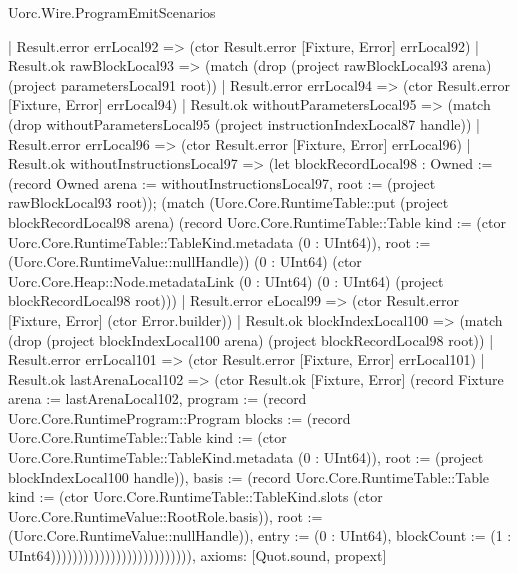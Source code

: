 \begin{lexlean}{Uorc.Wire.ProgramEmitScenarios}
\begin{semanticmodule}
{                            | Result.error errLocal92 => (ctor Result.error [Fixture, Error] errLocal92)
                            | Result.ok rawBlockLocal93 => (match (drop (project rawBlockLocal93 arena) (project parametersLocal91 root))
                              | Result.error errLocal94 => (ctor Result.error [Fixture, Error] errLocal94)
                              | Result.ok withoutParametersLocal95 => (match (drop withoutParametersLocal95 (project instructionIndexLocal87 handle))
                                | Result.error errLocal96 => (ctor Result.error [Fixture, Error] errLocal96)
                                | Result.ok withoutInstructionsLocal97 => (let blockRecordLocal98 : Owned := (record Owned {arena := withoutInstructionsLocal97, root := (project rawBlockLocal93 root)}); (match (Uorc.Core.RuntimeTable::put (project blockRecordLocal98 arena) (record Uorc.Core.RuntimeTable::Table {kind := (ctor Uorc.Core.RuntimeTable::TableKind.metadata (0 : UInt64)), root := (Uorc.Core.RuntimeValue::nullHandle)}) (0 : UInt64) (ctor Uorc.Core.Heap::Node.metadataLink (0 : UInt64) (0 : UInt64) (project blockRecordLocal98 root)))
                                  | Result.error eLocal99 => (ctor Result.error [Fixture, Error] (ctor Error.builder))
                                  | Result.ok blockIndexLocal100 => (match (drop (project blockIndexLocal100 arena) (project blockRecordLocal98 root))
                                    | Result.error errLocal101 => (ctor Result.error [Fixture, Error] errLocal101)
                                    | Result.ok lastArenaLocal102 => (ctor Result.ok [Fixture, Error] (record Fixture {arena := lastArenaLocal102, program := (record Uorc.Core.RuntimeProgram::Program {blocks := (record Uorc.Core.RuntimeTable::Table {kind := (ctor Uorc.Core.RuntimeTable::TableKind.metadata (0 : UInt64)), root := (project blockIndexLocal100 handle)}), basis := (record Uorc.Core.RuntimeTable::Table {kind := (ctor Uorc.Core.RuntimeTable::TableKind.slots (ctor Uorc.Core.RuntimeValue::RootRole.basis)), root := (Uorc.Core.RuntimeValue::nullHandle)}), entry := (0 : UInt64), blockCount := (1 : UInt64)})})))))))))))))))))))))))),
  axioms: [Quot.sound, propext]
}


\end{semanticmodule}
\end{lexlean}
